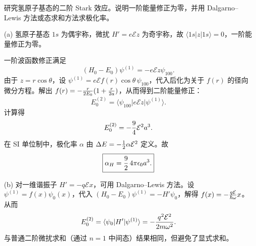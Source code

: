 \begin{question}
研究氢原子基态的二阶 Stark 效应。说明一阶能量修正为零，并用 Dalgarno--Lewis 方法或态求和方法求极化率。
\end{question}
\begin{solution}
(a) 氢原子基态 $1s$ 为偶宇称，微扰 $H'=e\mathcal Ez$ 为奇宇称，故 $\langle 1s|z|1s\rangle=0$，一阶能量修正为零。

一阶波函数修正满足
\[
(H_0 - E_0)\psi^{(1)} = -e\mathcal E z\psi_{100}.
\]
由于 $z = r\cos\theta$，设 $\psi^{(1)} = e\mathcal E f(r)\cos\theta\,\psi_{100}$，代入后化为关于 $f(r)$ 的径向微分方程。解出 $f(r) = -{r\over2E_0}(1+{r\over2a})$，从而得到二阶能量修正：
\[
E_0^{(2)} = \langle\psi_{100}|e\mathcal E z|\psi^{(1)}\rangle.
\]
计算得
\[
E_0^{(2)} = -{9\over4}\mathcal E^2 a^3.
\]
在 SI 单位制中，极化率 $\alpha$ 由 $\Delta E = -{1\over2}\alpha\mathcal E^2$ 定义。故
\[
\boxed{\alpha_H = {9\over2}\,4\pi\epsilon_0 a^3.}
\]

(b) 对一维谐振子 $H'=-q\mathcal Ex$，可用 Dalgarno--Lewis 方法。设 $\psi^{(1)} = f(x)\psi_0(x)$，代入 $(H_0-E_0)\psi^{(1)} = -H'\psi_0$，解得 $f(x) = -{q\mathcal E\over\hbar\omega}x$。从而
\[
E_0^{(2)} = \langle\psi_0|H'|\psi^{(1)}\rangle = -{q^2\mathcal E^2\over2m\omega^2}.
\]
与普通二阶微扰求和（通过 $n=1$ 中间态）结果相同，但避免了显式求和。
\end{solution}

